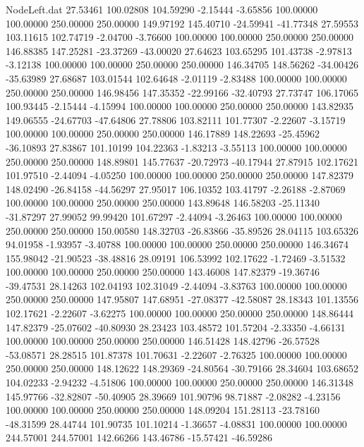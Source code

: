 \begin{filecontents}{NodeLeft.dat}
  27.53461  100.02808  104.59290    -2.15444   -3.65856  100.00000  100.00000  250.00000  250.00000  149.97192  145.40710  -24.59941  -41.77348
  27.59553  103.11615  102.74719    -2.04700   -3.76600  100.00000  100.00000  250.00000  250.00000  146.88385  147.25281  -23.37269  -43.00020
  27.64623  103.65295  101.43738    -2.97813   -3.12138  100.00000  100.00000  250.00000  250.00000  146.34705  148.56262  -34.00426  -35.63989
  27.68687  103.01544  102.64648    -2.01119   -2.83488  100.00000  100.00000  250.00000  250.00000  146.98456  147.35352  -22.99166  -32.40793
  27.73747  106.17065  100.93445    -2.15444   -4.15994  100.00000  100.00000  250.00000  250.00000  143.82935  149.06555  -24.67703  -47.64806
  27.78806  103.82111  101.77307    -2.22607   -3.15719  100.00000  100.00000  250.00000  250.00000  146.17889  148.22693  -25.45962  -36.10893
  27.83867  101.10199  104.22363    -1.83213   -3.55113  100.00000  100.00000  250.00000  250.00000  148.89801  145.77637  -20.72973  -40.17944
  27.87915  102.17621  101.97510    -2.44094   -4.05250  100.00000  100.00000  250.00000  250.00000  147.82379  148.02490  -26.84158  -44.56297
  27.95017  106.10352  103.41797    -2.26188   -2.87069  100.00000  100.00000  250.00000  250.00000  143.89648  146.58203  -25.11340  -31.87297
  27.99052   99.99420  101.67297    -2.44094   -3.26463  100.00000  100.00000  250.00000  250.00000  150.00580  148.32703  -26.83866  -35.89526
  28.04115  103.65326   94.01958    -1.93957   -3.40788  100.00000  100.00000  250.00000  250.00000  146.34674  155.98042  -21.90523  -38.48816
  28.09191  106.53992  102.17622    -1.72469   -3.51532  100.00000  100.00000  250.00000  250.00000  143.46008  147.82379  -19.36746  -39.47531
  28.14263  102.04193  102.31049    -2.44094   -3.83763  100.00000  100.00000  250.00000  250.00000  147.95807  147.68951  -27.08377  -42.58087
  28.18343  101.13556  102.17621    -2.22607   -3.62275  100.00000  100.00000  250.00000  250.00000  148.86444  147.82379  -25.07602  -40.80930
  28.23423  103.48572  101.57204    -2.33350   -4.66131  100.00000  100.00000  250.00000  250.00000  146.51428  148.42796  -26.57528  -53.08571
  28.28515  101.87378  101.70631    -2.22607   -2.76325  100.00000  100.00000  250.00000  250.00000  148.12622  148.29369  -24.80564  -30.79166
  28.34604  103.68652  104.02233    -2.94232   -4.51806  100.00000  100.00000  250.00000  250.00000  146.31348  145.97766  -32.82807  -50.40905
  28.39669  101.90796   98.71887    -2.08282   -4.23156  100.00000  100.00000  250.00000  250.00000  148.09204  151.28113  -23.78160  -48.31599
  28.44744  101.90735  101.10214    -1.36657   -4.08831  100.00000  100.00000  244.57001  244.57001  142.66266  143.46786  -15.57421  -46.59286

\end{filecontents}
